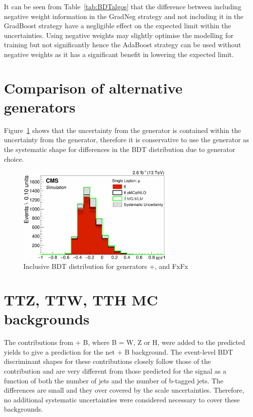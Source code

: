 It can be seen from Table~\ref{tab:BDTalgos} that the difference between including negative weight information in the GradNeg strategy and not including it in the GradBoost strategy have a negligible effect on the expected limit within the uncertainties. Using negative weights may slightly optimise the modelling for training but not significantly hence the AdaBoost strategy can be used without negative weights as it has a significant benefit in lowering the expected limit.



\section{Comparison of alternative \ttbar generators}

Figure~\ref{fig:MGFXFX} shows that the uncertainty from the \MADGRAPH \aMCATNLO generator is contained within the uncertainty from the \MLM generator, therefore it is conservative to use the \MLM generator as the systematic shape for differences in the BDT distribution due to generator choice.

\begin{figure}[ht]
\centering
    \includegraphics[width=0.7\textwidth]{images/Run2/MG_FXFX.pdf}
    \caption{Inclusive BDT distribution for \ttbar generators \POWHEG+\PYTHIA, \MLM and \MADGRAPH \aMCATNLO FxFx}
    \label{fig:MGFXFX}
\end{figure} 


\section{TTZ, TTW, TTH MC backgrounds~\label{app:TTX}}
The contributions from \ttbar + B, where B = W, Z or H, were added to the predicted \ttbar yields to give a prediction for the net \ttbar + B background. The event-level BDT discriminant shapes for these contributions closely follow those of the \ttbar contribution and are very different from those predicted for the \tttt signal as a function of both the number of jets and the number of b-tagged jets. The differences are small and they over covered by the \ttbar scale uncertainties. Therefore, no additional systematic uncertainties were considered necessary to cover these backgrounds.


